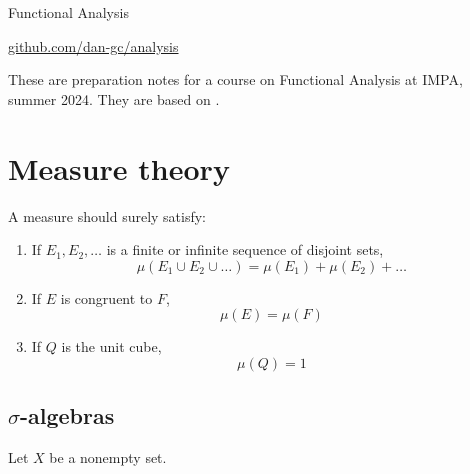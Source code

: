 \documentclass{article}
\theoremstyle{definition}
\numberwithin{equation}{section}
\begin{document}
	\begin{center}
		{\LARGE Functional Analysis}

		\href{https://github.com/dan-gc/analysis}{github.com/dan-gc/analysis}
	\end{center}
	These are preparation notes for a course on Functional Analysis at IMPA, summer 2024. They are based on \cite{folland,narici,brezis}.
	\tableofcontents
	\clearpage
\section{Measure theory}
	{\small \color{blue}A measure should surely satisfy:
	\begin{enumerate}
		\item If $E_1,E_2,\ldots$ is a finite or infinite sequence of disjoint sets,
		\[\mu(E_1\cup E_2\cup\ldots)=\mu(E_1)+\mu(E_2)+\ldots\]
		
		\item If $E$ is congruent to $F$,
		\[\mu(E)=\mu(F)\]
		
		\item If $Q$ is the unit cube,
		\[\mu(Q)=1\]
	\end{enumerate}}
	\subsection{$\sigma$-algebras}\label{subsec:sigma-algebras}
	Let $X$ be a nonempty set. 
	
\end{document}
